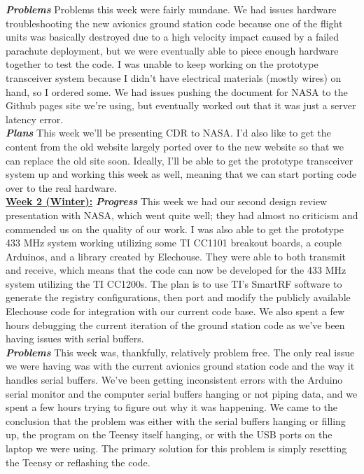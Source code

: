\documentclass[onecolumn, draftclsnofoot, 10pt, compsoc]{IEEEtran}
\begin{document}
\textbf{\textit{{Problems}}}
\newline Problems this week were fairly mundane. We had issues hardware troubleshooting the new avionics ground station code because one of the flight units was basically destroyed due to a high velocity impact caused by a failed parachute deployment, but we were eventually able to piece enough hardware together to test the code. I was unable to keep working on the prototype transceiver system because I didn't have electrical materials (mostly wires) on hand, so I ordered some. We had issues pushing the document for NASA to the Github pages site we're using, but eventually worked out that it was just a server latency error. \\

\textbf{\textit{{Plans}}}
\newline This week we'll be presenting CDR to NASA. I'd also like to get the content from the old website largely ported over to the new website so that we can replace the old site soon. Ideally, I'll be able to get the prototype transceiver system up and working this week as well, meaning that we can start porting code over to the real hardware. \\

\underline{\textbf{Week 2 (Winter):}}
\newline\textbf{\textit{{Progress}}}
\newline This week we had our second design review presentation with NASA, which went quite well; they had almost no criticism and commended us on the quality of our work. I was also able to get the prototype 433 MHz system working utilizing some TI CC1101 breakout boards, a couple Arduinos, and a library created by Elechouse. They were able to both transmit and receive, which means that the code can now be developed for the 433 MHz system utilizing the TI CC1200s. The plan is to use TI's SmartRF software to generate the registry configurations, then port and modify the publicly available Elechouse code for integration with our current code base. We also spent a few hours debugging the current iteration of the ground station code as we've been having issues with serial buffers. \\

\textbf{\textit{{Problems}}}
\newline This week was, thankfully, relatively problem free. The only real issue we were having was with the current avionics ground station code and the way it handles serial buffers. We've been getting inconsistent errors with the Arduino serial monitor and the computer serial buffers hanging or not piping data, and we spent a few hours trying to figure out why it was happening. We came to the conclusion that the problem was either with the serial buffers hanging or filling up, the program on the Teensy itself hanging, or with the USB ports on the laptop we were using. The primary solution for this problem is simply resetting the Teensy or reflashing the code. \\
\end{document}
